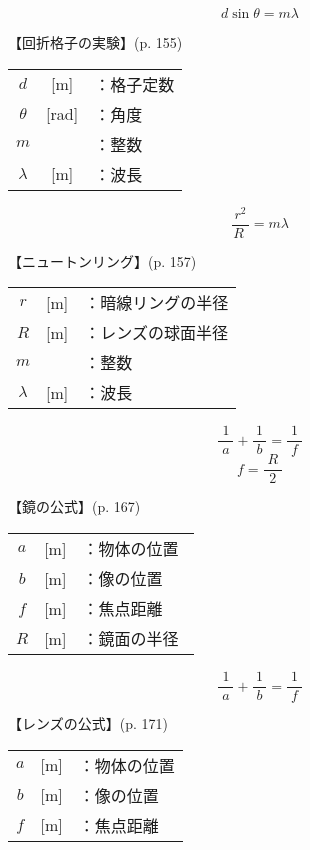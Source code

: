 \documentclass[10pt]{jarticle}
\begin{document}
\newpage




\[
d \sin\theta = m \lambda
\]


\vskip3mm
【回折格子の実験】{\footnotesize (p. 155)}

\begin{tabular}{ccl}
$d$	&[m]	&：格子定数\\
$\theta$	&[rad]	&：角度\\
$m$	&	&：整数\\
$\lambda$	&[m]	&：波長\\
\end{tabular}

\newpage




\[
\frac{\, r^2\, }{R \;} = m \lambda
\]


\vskip3mm
【ニュートンリング】{\footnotesize (p. 157)}

\begin{tabular}{ccl}
$r$	&[m]	&：暗線リングの半径\\
$R$	&[m]	&：レンズの球面半径\\
$m$	&	&：整数\\
$\lambda$	&[m]	&：波長\\
\end{tabular}

\newpage





\[
\frac{1}{\; a \;} + \frac{1}{\; b \;} = \frac{1}{\; f \;}
\]
\[
f = \frac{\; R \;}{2}
\]


\vskip3mm
【鏡の公式】{\footnotesize (p. 167)}

\begin{tabular}{ccl}
$a$	&[m]	&：物体の位置\\
$b$	&[m]	&：像の位置\\
$f$	&[m]	&：焦点距離\\
$R$	&[m]	&：鏡面の半径\
\end{tabular}

\newpage





\[
\frac{1}{\; a \;} + \frac{1}{\; b \;} = \frac{1}{\; f \;}
\]


\vskip3mm
【レンズの公式】{\footnotesize (p. 171)}

\begin{tabular}{ccl}
$a$	&[m]	&：物体の位置\\
$b$	&[m]	&：像の位置\\
$f$	&[m]	&：焦点距離
\end{tabular}

\newpage
\end{document}
